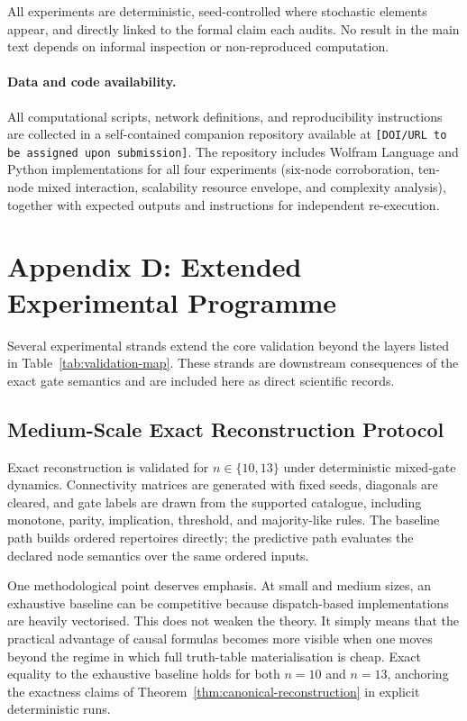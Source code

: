 \documentclass[11pt]{article}
\theoremstyle{definition}
\begin{document}
All experiments are deterministic, seed-controlled where stochastic elements appear, and directly linked to the formal claim each audits. No result in the main text depends on informal inspection or non-reproduced computation.

\paragraph{Data and code availability.}
All computational scripts, network definitions, and reproducibility instructions are collected in a self-contained companion repository available at \texttt{[DOI/URL to be assigned upon submission]}. The repository includes Wolfram Language and Python implementations for all four experiments (six-node corroboration, ten-node mixed interaction, scalability resource envelope, and complexity analysis), together with expected outputs and instructions for independent re-execution.

\section{Appendix D: Extended Experimental Programme}
Several experimental strands extend the core validation beyond the layers listed in Table~\ref{tab:validation-map}. These strands are downstream consequences of the exact gate semantics and are included here as direct scientific records.

\subsection{Medium-Scale Exact Reconstruction Protocol}
Exact reconstruction is validated for \(n\in\{10,13\}\) under deterministic mixed-gate dynamics. Connectivity matrices are generated with fixed seeds, diagonals are cleared, and gate labels are drawn from the supported catalogue, including monotone, parity, implication, threshold, and majority-like rules. The baseline path builds ordered repertoires directly; the predictive path evaluates the declared node semantics over the same ordered inputs.

One methodological point deserves emphasis. At small and medium sizes, an exhaustive baseline can be competitive because dispatch-based implementations are heavily vectorised. This does not weaken the theory. It simply means that the practical advantage of causal formulas becomes more visible when one moves beyond the regime in which full truth-table materialisation is cheap. Exact equality to the exhaustive baseline holds for both \(n=10\) and \(n=13\), anchoring the exactness claims of Theorem~\ref{thm:canonical-reconstruction} in explicit deterministic runs.
\end{document}
